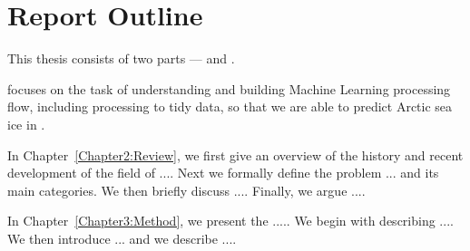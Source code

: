 \section{Report Outline} %

This thesis consists of two parts ---  and .

 focuses on the task of understanding and building Machine Learning processing flow, including processing to tidy data, so that we are able to predict Arctic sea ice in .

\begin{description}
    \item In Chapter~\ref{Chapter2:Review}, we first give an overview of the history and recent development of the field of .... Next we formally define the problem ... and its main categories. We then briefly discuss ....  Finally, we argue ....
    \item In Chapter~\ref{Chapter3:Method}, we present the ..... We begin with describing .... We then introduce ... and we describe .... 
   
\end{description}